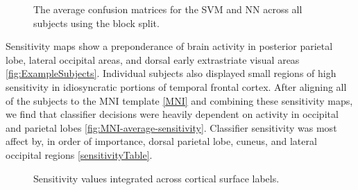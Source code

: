 \documentclass[preprint,5p,authoryear]{elsarticle}
\begin{document}
\begin{figure}
\centering
\begin{subfigure}{0.4\textwidth}
\centering

\caption{}
\label{fig:average-confusion-svm}
\end{subfigure}
\begin{subfigure}{0.4\textwidth}
\centering

\caption{}
\label{fig:average-confusion-nn}
\end{subfigure}
\caption{The average confusion matrices for the  SVM and  NN across all subjects using the block split.}
\label{fig:average-confusion}
\end{figure}

Sensitivity maps show a preponderance of brain activity in posterior parietal lobe, lateral occipital areas, and dorsal early extrastriate visual areas \ref{fig:ExampleSubjects}. Individual subjects also displayed small regions of high sensitivity in idiosyncratic portions of temporal frontal cortex. After aligning all of the subjects to the MNI template \ref{MNI} and combining these sensitivity maps, we find that classifier decisions were heavily dependent on activity in occipital and parietal lobes \ref{fig:MNI-average-sensitivity}.  Classifier sensitivity was most affect by, in order of importance, dorsal parietal lobe, cuneus, and lateral occipital regions \ref{sensitivityTable}. 

\begin{figure}
\centering

\caption{Sensitivity values integrated across cortical surface labels.}
\label{tab:full-sensitivity}
\end{figure}
\end{document}
